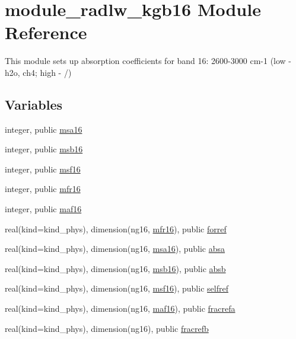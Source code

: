 \hypertarget{namespacemodule__radlw__kgb16}{}\section{module\+\_\+radlw\+\_\+kgb16 Module Reference}
\label{namespacemodule__radlw__kgb16}


This module sets up absorption coefficients for band 16\+: 2600-\/3000 cm-\/1 (low -\/ h2o, ch4; high -\/ /)  


\subsection*{Variables}
\begin{DoxyCompactItemize}
\item 
integer, public \hyperlink{namespacemodule__radlw__kgb16_a95bf5395b579ca6619de3fc40c7ded79}{msa16}
\item 
integer, public \hyperlink{namespacemodule__radlw__kgb16_a18ad5b461d6c71b1aa2d82d5694beb03}{msb16}
\item 
integer, public \hyperlink{namespacemodule__radlw__kgb16_a8601911604c1d6a1b32e434159ae95d2}{msf16}
\item 
integer, public \hyperlink{namespacemodule__radlw__kgb16_a82777667b951207c62955e3e1492d79d}{mfr16}
\item 
integer, public \hyperlink{namespacemodule__radlw__kgb16_aae4c96f4a2ae49c573189f2d63ccd4a3}{maf16}
\item 
real(kind=kind\+\_\+phys), dimension(ng16, \hyperlink{namespacemodule__radlw__kgb16_a82777667b951207c62955e3e1492d79d}{mfr16}), public \hyperlink{namespacemodule__radlw__kgb16_a4402ed68e18459813a6c9ede5d6ba9cc}{forref}
\item 
real(kind=kind\+\_\+phys), dimension(ng16, \hyperlink{namespacemodule__radlw__kgb16_a95bf5395b579ca6619de3fc40c7ded79}{msa16}), public \hyperlink{namespacemodule__radlw__kgb16_a2734b420b7e8e8393a8bf1b595a3cf09}{absa}
\item 
real(kind=kind\+\_\+phys), dimension(ng16, \hyperlink{namespacemodule__radlw__kgb16_a18ad5b461d6c71b1aa2d82d5694beb03}{msb16}), public \hyperlink{namespacemodule__radlw__kgb16_ae856b42252b71d4d588ea5e19e871cac}{absb}
\item 
real(kind=kind\+\_\+phys), dimension(ng16, \hyperlink{namespacemodule__radlw__kgb16_a8601911604c1d6a1b32e434159ae95d2}{msf16}), public \hyperlink{namespacemodule__radlw__kgb16_afaa2554e1161bd6c983ce630d39d703a}{selfref}
\item 
real(kind=kind\+\_\+phys), dimension(ng16, \hyperlink{namespacemodule__radlw__kgb16_aae4c96f4a2ae49c573189f2d63ccd4a3}{maf16}), public \hyperlink{namespacemodule__radlw__kgb16_a355dcc9f6f4955ab3d7ee0a22005c8ba}{fracrefa}
\item 
real(kind=kind\+\_\+phys), dimension(ng16), public \hyperlink{namespacemodule__radlw__kgb16_ab93affafac8e2bb182982133a6449de4}{fracrefb}
\end{DoxyCompactItemize}


